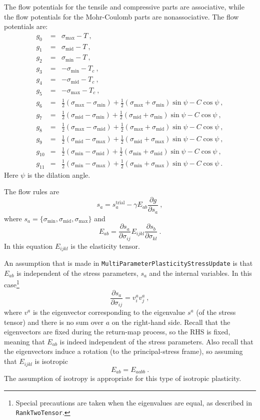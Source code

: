 \documentclass[]{scrreprt}
\newcommand{\ha}{\mbox{$\frac{1}{2}$}}
\newcommand{\ga}{\gamma}
\newcommand{\smax}{\sigma_{\mathrm{max}}}
\newcommand{\smid}{\sigma_{\mathrm{mid}}}
\newcommand{\smin}{\sigma_{\mathrm{min}}}
\begin{document}
The flow potentials for the
tensile and compressive parts are associative, while the flow
potentials for the Mohr-Coulomb parts are nonassociative.  The flow
potentials are:
\begin{eqnarray}
  g_{0} & = & \smax - T \ , \nonumber \\
  g_{1} & = & \smid - T \ , \nonumber \\
  g_{2} & = & \smin - T \ , \nonumber \\
  g_{3} & = & -\smin - T_{c} \ , \nonumber \\
  g_{4} & = & -\smid - T_{c} \ , \nonumber \\
  g_{5} & = & -\smax - T_{c} \ , \nonumber \\
g_{6} & = & \ha (\smax - \smin) +
\ha(\smax+\smin)\sin\psi - C\cos\psi \ , \nonumber \\
g_{7} & = & \ha (\smid - \smin) +
\ha(\smid+\smin)\sin\psi - C\cos\psi \ , \nonumber \\
g_{8} & = & \ha (\smax - \smid) +
\ha(\smax+\smid)\sin\psi - C\cos\psi \ , \nonumber \\
g_{9} & = & \ha (\smid - \smax) +
\ha(\smid+\smax)\sin\psi - C\cos\psi \ , \nonumber \\
g_{10} & = & \ha (\smin - \smid) +
\ha(\smin+\smid)\sin\psi - C\cos\psi \ , \nonumber \\
g_{11} & = & \ha (\smin - \smax) +
\ha(\smin+\smax)\sin\psi - C\cos\psi \ .
\end{eqnarray}
Here $\psi$ is the dilation angle.

The flow rules are
\begin{equation}
  s_{a} = s_{a}^{\mathrm{trial}} - \ga E_{ab} \frac{\partial
    g}{\partial s_{a}} \ ,
  \label{eqn.flow.rules}
\end{equation}
where $s_{a}=\{\smin, \smid, \smax\}$ and
\begin{equation}
  E_{ab} = \frac{\partial s_{a}}{\partial \sigma_{ij}} E_{ijkl}
  \frac{\partial s_{b}}{\partial \sigma_{kl}} \ .
\end{equation}
In this equation $E_{ijkl}$ is the elasticity tensor.

An assumption
that is made in {\tt  MultiParameterPlasticityStressUpdate} is that
$E_{ab}$ is independent of the stress parameters, $s_{a}$ and the
internal variables.  In this case\footnote{Special precautions are
  taken when the eigenvalues are equal, as described in {\tt RankTwoTensor}.}
\begin{equation}
  \frac{\partial s_{a}}{\partial \sigma_{ij}} = v_{i}^{a}v_{j}^{a} \ ,
\end{equation}
where $v^{a}$ is the eigenvector corresponding to the eigenvalue
$s^{a}$ (of the stress tensor) and there is no sum over $a$ on the
right-hand side.  Recall that the eigenvectors are fixed during the
return-map process, so the RHS is fixed, meaning that $E_{ab}$ is
indeed independent of the stress parameters.  Also recall that the
eigenvectors induce a rotation (to the principal-stress frame), so
assuming that $E_{ijkl}$ is isotropic
\begin{equation}
  E_{ab} = E_{aabb} \ .
\end{equation}
The assumption of isotropy is appropriate for this type of isotropic
plasticity.
\end{document}
